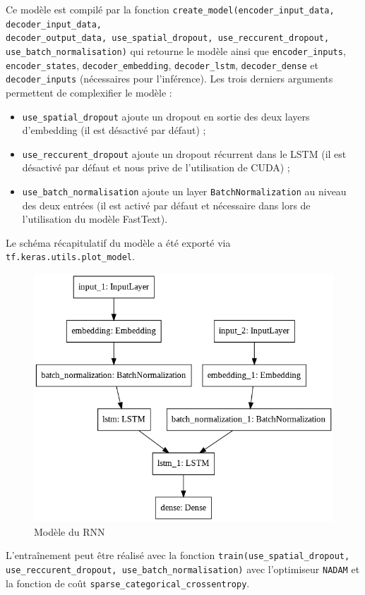 \documentclass[10pt,a4paper]{article}
\begin{document}
Ce modèle est compilé par la fonction \texttt{create\_model(encoder\_input\_data, decoder\_input\_data, \\ decoder\_output\_data, use\_spatial\_dropout, use\_reccurent\_dropout, use\_batch\_normalisation)} qui retourne le modèle ainsi que \texttt{encoder\_inputs}, \texttt{encoder\_states}, \texttt{decoder\_embedding}, \texttt{decoder\_lstm}, \texttt{decoder\_dense} et \texttt{decoder\_inputs} (nécessaires pour l'inférence). Les trois derniers arguments permettent de complexifier le modèle :
\begin{itemize}
	\item \texttt{use\_spatial\_dropout} ajoute un dropout en sortie des deux layers d'embedding (il est désactivé par défaut) ;
	\item \texttt{use\_reccurent\_dropout} ajoute un dropout récurrent dans le LSTM (il est désactivé par défaut et nous prive de l'utilisation de CUDA) ;
	\item \texttt{use\_batch\_normalisation} ajoute un layer \texttt{BatchNormalization} au niveau des deux entrées (il est activé par défaut et nécessaire dans lors de l'utilisation du modèle FastText).
\end{itemize}
Le schéma récapitulatif du modèle a été exporté via \texttt{tf.keras.utils.plot\_model}.
\begin{figure}
	\centering
	\includegraphics[scale=0.5]{model.png}
	\caption{Modèle du RNN}
\end{figure}
L'entraînement peut être réalisé avec la fonction \texttt{train(use\_spatial\_dropout, use\_reccurent\_dropout, use\_batch\_normalisation)} avec l'optimiseur \texttt{NADAM} et la fonction de coût \texttt{sparse\_categorical\_crossentropy}.
\end{document}
